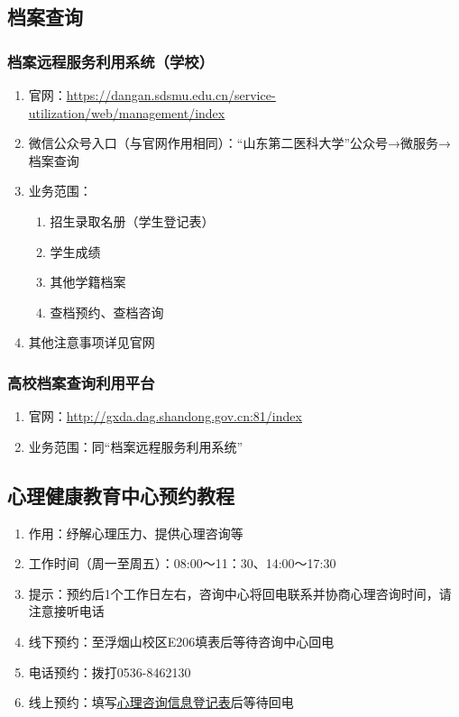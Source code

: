 \subsection[档案查询]{档案查询}
\subsubsection[档案远程服务利用系统（学校）]{档案远程服务利用系统（学校）}
\begin{enumerate}
    \item 官网：\uline{\href{https://dangan.sdsmu.edu.cn/service-utilization/web/management/index}{https://dangan.sdsmu.edu.cn/service-utilization/web/management/index}}
    \item 微信公众号入口（与官网作用相同）：“山东第二医科大学”公众号→微服务→档案查询
    \item 业务范围：
          \begin{enumerate}
              \item 招生录取名册（学生登记表）
              \item 学生成绩
              \item 其他学籍档案
              \item 查档预约、查档咨询
          \end{enumerate}
    \item 其他注意事项详见官网
\end{enumerate}
\subsubsection[高校档案查询利用平台]{高校档案查询利用平台}
\begin{enumerate}
    \item 官网：\uline{\href{http://gxda.dag.shandong.gov.cn:81/index}{http://gxda.dag.shandong.gov.cn:81/index}}
    \item 业务范围：同“档案远程服务利用系统”
\end{enumerate}

\subsection[心理健康教育中心预约教程]{心理健康教育中心预约教程}
\begin{enumerate}
    \item 作用：纾解心理压力、提供心理咨询等
    \item 工作时间（周一至周五）：08:00～11：30、14:00～17:30
    \item 提示：预约后1个工作日左右，咨询中心将回电联系并协商心理咨询时间，请注意接听电话
    \item 线下预约：至浮烟山校区E206填表后等待咨询中心回电
    \item 电话预约：拨打0536-8462130
    \item 线上预约：填写\uline{\href{https://www.wjx.cn/vm/YOHd59S.aspx}{心理咨询信息登记表}}后等待回电

\end{enumerate}

